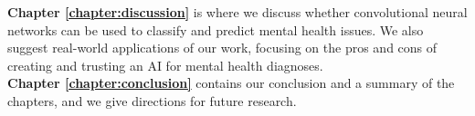 \noindent \textbf{Chapter \ref{chapter:discussion}} is where we discuss whether convolutional neural networks can be used to classify and predict mental health issues. We also suggest real-world applications of our work, focusing on the pros and cons of creating and trusting an AI for mental health diagnoses. \\

\noindent \textbf{Chapter \ref{chapter:conclusion}} contains our conclusion and a summary of the chapters, and we give directions for future research.

